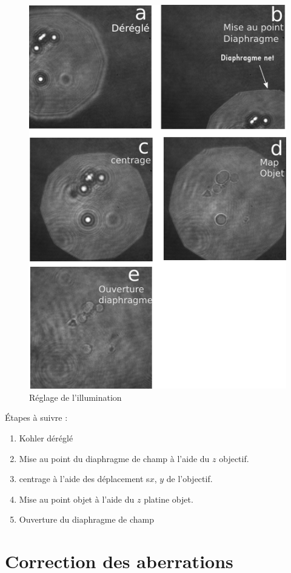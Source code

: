 \documentclass[	french,DIV=calc,%
							paper=a4,%
							fontsize=11pt,%
							twocolumn]{scrartcl}	 					%
\begin{document}
\begin{figure}
	\includegraphics[]{images/Kohler/kohler.pdf}
	\caption{Réglage de l'illumination}\label{kohler}
\end{figure}

Étapes à suivre :
\begin{enumerate}
	\item Kohler déréglé
	\item Mise au point du diaphragme de champ à l'aide du $z$ objectif.
	\item centrage à l'aide des déplacement s$x$, $y$ de l'objectif.
	\item Mise au point objet à l'aide du $z$ platine objet.
	\item Ouverture du diaphragme de champ
\end{enumerate}
	
\section{Correction des aberrations}
\end{document}
